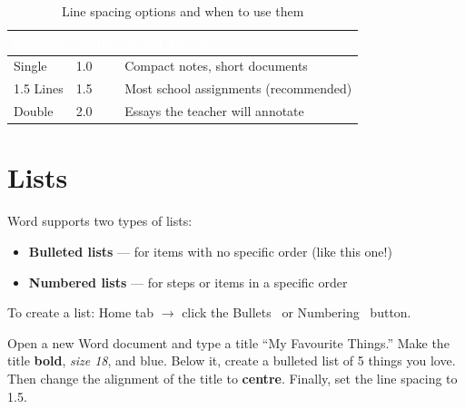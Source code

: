 \begin{table}[H]
\centering
\caption{Line spacing options and when to use them}
\label{tab:line-spacing}
\renewcommand{\arraystretch}{1.3}
\begin{tabularx}{\textwidth}{l l X}
\toprule
\rowcolor{HeaderRow}
\textcolor{white}{\textbf{Spacing}} & \textcolor{white}{\textbf{Value}} & \textcolor{white}{\textbf{When To Use}} \\
\midrule
\rowcolor{RowLight} Single & 1.0 & Compact notes, short documents \\
\rowcolor{RowDark} 1.5 Lines & 1.5 & Most school assignments (recommended) \\
\rowcolor{RowLight} Double & 2.0 & Essays the teacher will annotate \\
\bottomrule
\end{tabularx}
\end{table}

\section{Lists}
\label{sec:lists}

Word supports two types of lists:
\begin{itemize}[leftmargin=*, label={\textcolor{ModuleBlue}{\faAngleRight}}, itemsep=2pt]
  \item \textbf{Bulleted lists} --- for items with no specific order (like this one!)
  \item \textbf{Numbered lists} --- for steps or items in a specific order
\end{itemize}

To create a list: Home tab $\rightarrow$ click the Bullets \faBars\ or Numbering \faListOl\ button.


\begin{tryit}
Open a new Word document and type a title ``My Favourite Things.'' Make the title \textbf{bold}, \textit{size 18}, and \textcolor{ModuleBlue}{blue}. Below it, create a bulleted list of 5 things you love. Then change the alignment of the title to \textbf{centre}. Finally, set the line spacing to 1.5.
\end{tryit}

